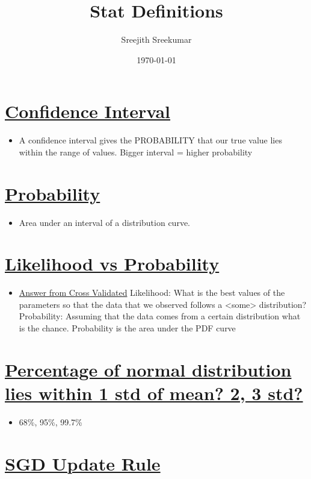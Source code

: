 \documentclass[11pt]{article}
\author{Sreejith Sreekumar}
\date{\today}
\title{Stat Definitions}
\begin{document}
\maketitle
\tableofcontents




\section{\underline{Confidence Interval}}
\label{sec:orge20baef}
\begin{itemize}
\item A confidence interval gives the PROBABILITY that our true value lies within the range of values. Bigger interval = higher probability
\end{itemize}

\section{\underline{Probability}}
\label{sec:org7ddbc21}
\begin{itemize}
\item Area under an interval of a distribution curve.
\end{itemize}

\section{\underline{Likelihood vs Probability}}
\label{sec:orga0c8307}

\begin{itemize}
\item \href{https://stats.stackexchange.com/a/183885/84189}{Answer from Cross Validated}
Likelihood: What is the best values of the parameters so that the data that we observed follows a <some> distribution?
Probability: Assuming that the data comes from a certain distribution what is the chance. Probability is the area under the PDF curve
\end{itemize}

\section{\underline{Percentage of normal distribution lies within 1 std of mean? 2, 3 std?}}
\label{sec:orgc8753fe}
\begin{itemize}
\item 68\%, 95\%, 99.7\%
\end{itemize}

\section{\underline{SGD Update Rule}}
\label{sec:orgb2ea3f9}
\end{document}
